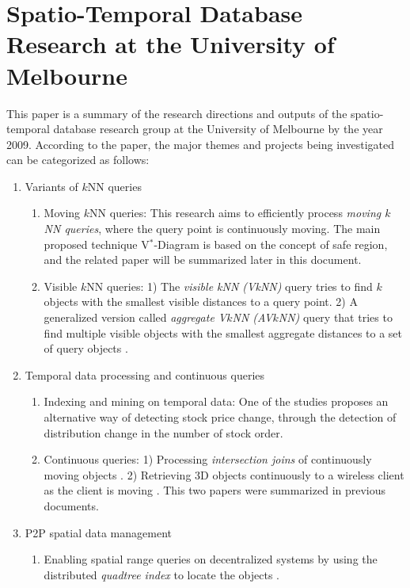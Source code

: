 \documentclass[paper=a4, fontsize=18pt]{article} %
\numberwithin{equation}{section} %
\numberwithin{figure}{section} %
\numberwithin{table}{section} %
\begin{document}
\section{Spatio-Temporal Database Research at the University of Melbourne \cite{TZK09}}

This paper is a summary of the research directions and outputs of the spatio-temporal database research group at the University of Melbourne by the year 2009. According to the paper, the major themes and projects being investigated can be categorized as follows:

\begin{enumerate}
\item {Variants of $k$NN queries
    \begin{enumerate}
    \item {Moving $k$NN queries: This research aims to efficiently process \emph{moving $k$NN queries}, where the query point is continuously moving. The main proposed technique V$^*$-Diagram \cite{NZTK08} is based on the concept of safe region, and the related paper will be summarized later in this document.
    }
    \item {Visible $k$NN queries: 1) The \emph{visible kNN (VkNN)} query \cite{NTZ07} tries to find $k$ objects with the smallest visible distances to a query point. 2) A generalized version called \emph{aggregate V$k$NN (AV$k$NN)} query that tries to find multiple visible objects with the smallest aggregate distances to a set of query objects \cite{NTZ10}.
    }
    \end{enumerate}
}
\item {Temporal data processing and continuous queries
    \begin{enumerate}
    \item {Indexing and mining on temporal data: One of the studies  \cite{LWWZBR10} proposes an alternative way of detecting stock price change, through the detection of distribution change in the number of stock order.
    }
    \item {Continuous queries: 1) Processing \emph{intersection joins} of continuously moving objects \cite{ZLRB08}. 2) Retrieving 3D objects continuously to a wireless client as the client is moving \cite{AZTK08}. This two papers were summarized in previous documents.}
    \end{enumerate}
}
\item {P2P spatial data management
    \begin{enumerate}
    \item Enabling spatial range queries on decentralized systems by using the distributed \emph{quadtree index} to locate the objects \cite{THS07}.

\end{enumerate}}
\end{enumerate}
\end{document}
